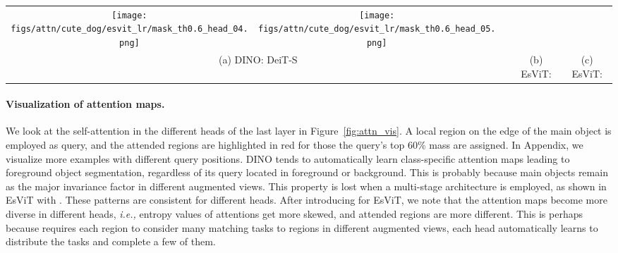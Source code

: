 \documentclass{article} \usepackage{iclr2022_conference,times}
\newcommand{\ie}[0]{\emph{i.e., }}
\newcommand{\shortname}{EsViT}
\begin{document}
\begin{figure*}[t!]
\begin{tabular}{c c c c c c c c c}
		\texttt{[image: figs/attn/cute\_dog/esvit\_lr/mask\_th0.6\_head\_04.png]} & 
		\hspace{-4mm}
		\texttt{[image: figs/attn/cute\_dog/esvit\_lr/mask\_th0.6\_head\_05.png]}
		\\	
		\multicolumn{3}{c}{(a) DINO: DeiT-S} & 
		\multicolumn{3}{c}{(b) \shortname{}:  } & 
		\multicolumn{3}{c}{(c) \shortname{}:  } \\
\end{tabular}
	\vspace{-3mm}
	\caption{Visualization of the the learned attention map for different heads in the last layer. The query is the {\bf \textcolor{blue!50}{blue}} dot in the center of the images. We visualize masks (as {\bf \textcolor{red}{red}}) obtained by thresholding the self-attention maps to
keep 60\% of the probability mass.  Note that all 6 heads are visualized for DINO with DeiT-S, and 6 out of 24 heads in \shortname{} are chosen to visualize (ranked by entropy values). Please see enlarged pictures with all heads in Appendix.
	 }
	\vspace{-5mm}
	\label{fig:attn_vis}
\end{figure*}








\paragraph{Visualization of attention maps.} We look at the self-attention in the different heads of the last layer in Figure~\ref{fig:attn_vis}. A local region on the edge of the main object is employed as query, and the attended regions are highlighted in red for those the query's top 60\% mass are assigned. In Appendix, we visualize more examples with different query positions.
DINO tends to automatically learn class-specific attention maps leading to foreground object segmentation, regardless of its query located in foreground or background. This is probably because main objects remain as the major invariance factor in different augmented views.
This property is lost when a multi-stage architecture is employed, as shown in \shortname{} with . These patterns are consistent for different heads. After introducing  for \shortname{}, we note that the attention maps become more diverse in different heads, \ie entropy values of attentions get more skewed, and attended regions are more different. This is perhaps because    requires each region to consider many matching tasks to regions in different augmented views, each head automatically learns to distribute the tasks and complete a few of them.
\end{document}
